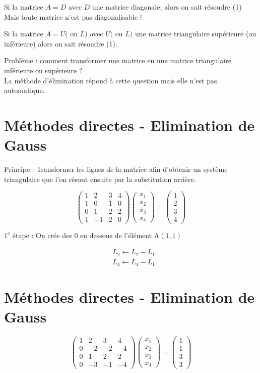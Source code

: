 \documentclass[10pt]{article}
\begin{document}
Si la matrice \(A=D\) avec \(D\) une matrice diagonale, alors on sait résoudre (1) Mais toute matrice n'est pas diagonalisable !

Si la matrice \(A=U(\) ou \(L)\) avec \(U(\) ou \(L)\) une matrice triangulaire supérieure (ou inférieure) alors on sait résoudre (1).

Problème : comment transformer une matrice en une matrice triangulaire inférieure ou supérieure ?\\
La méthode d'élimination répond à cette question mais elle n'est pas automatique.

\section*{Méthodes directes - Elimination de Gauss}
Principe : Transformer les lignes de la matrice afin d'obtenir un système triangulaire que l'on résout ensuite par la substitution arrière.

\[
\left(\begin{array}{cccc}
1 & 2 & 3 & 4 \\
1 & 0 & 1 & 0 \\
0 & 1 & 2 & 2 \\
1 & -1 & 2 & 0
\end{array}\right)\left(\begin{array}{l}
x_{1} \\
x_{2} \\
x_{3} \\
x_{4}
\end{array}\right)=\left(\begin{array}{l}
1 \\
2 \\
3 \\
4
\end{array}\right)
\]

\(1^{\mathrm{e}}\) étape : On crée des 0 en dessous de l'élément \(\mathrm{A}(1,1)\)

\[
\begin{aligned}
& L_{2} \leftarrow L_{2}-L_{1} \\
& L_{4} \leftarrow L_{4}-L_{1}
\end{aligned}
\]

\section*{Méthodes directes - Elimination de Gauss}
\[
\left(\begin{array}{cccc}
1 & 2 & 3 & 4 \\
0 & -2 & -2 & -4 \\
0 & 1 & 2 & 2 \\
0 & -3 & -1 & -4
\end{array}\right)\left(\begin{array}{l}
x_{1} \\
x_{2} \\
x_{3} \\
x_{4}
\end{array}\right)=\left(\begin{array}{l}
1 \\
1 \\
3 \\
3
\end{array}\right)
\]
\end{document}
